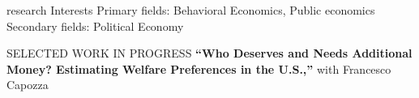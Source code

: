 \documentclass{resume} %
\begin{document}

 \begin{rSection}{research Interests}
 Primary fields: Behavioral Economics, Public economics \\
 Secondary fields: Political Economy
 \end{rSection}

\begin{rSection}{SELECTED WORK IN PROGRESS}
  \textbf{``Who Deserves and Needs Additional Money? Estimating Welfare Preferences in the U.S.,”} with Francesco Capozza
\end{rSection}

\end{document}
